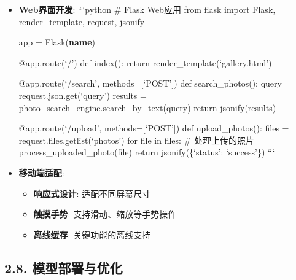 \begin{itemize}
\item
  \textbf{Web界面开发}: ```python \# Flask Web应用 from flask import
  Flask, render\_template, request, jsonify

  app = Flask(\textbf{name})

  @app.route(`/') def index(): return render\_template(`gallery.html')

  @app.route(`/search', methods={[}`POST'{]}) def search\_photos():
  query = request.json.get(`query') results =
  photo\_search\_engine.search\_by\_text(query) return jsonify(results)

  @app.route(`/upload', methods={[}`POST'{]}) def upload\_photos():
  files = request.files.getlist(`photos') for file in files: \#
  处理上传的照片 process\_uploaded\_photo(file) return
  jsonify(\{`status': `success'\}) ```
\item
  \textbf{移动端适配}:

  \begin{itemize}
  \tightlist
  \item
    \textbf{响应式设计}: 适配不同屏幕尺寸
  \item
    \textbf{触摸手势}: 支持滑动、缩放等手势操作
  \item
    \textbf{离线缓存}: 关键功能的离线支持
  \end{itemize}
\end{itemize}

\subsection{2.8.
模型部署与优化}\label{ux6a21ux578bux90e8ux7f72ux4e0eux4f18ux5316}

